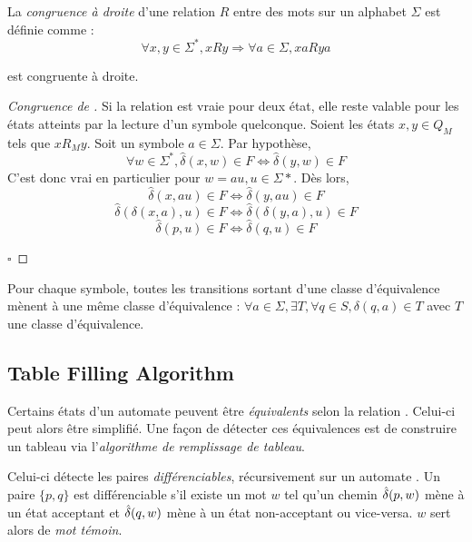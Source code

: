 La \emph{congruence à droite} d'une relation $R$ entre des mots sur un alphabet $\Sigma$ est définie comme :
$$
\forall x,y \in \Sigma^*, xRy \Rightarrow \forall a \in \Sigma, xaRya
$$

\begin{proposition}[Congruence de \rm]
 \rm est congruente à droite.
\end{proposition}

\begin{proof}[Congruence de \rm]
 Si la relation est vraie pour deux état, elle reste valable pour les états atteints par la lecture d'un symbole quelconque. Soient les états $x,y \in Q_M$ tels que $xR_My$. Soit un symbole $a \in \Sigma$. Par hypothèse,
 $$\forall w \in \Sigma^*, \hat{\delta}(x, w) \in F \iff \hat{\delta}(y, w) \in F$$
 C'est donc vrai en particulier pour $w = au, u \in \Sigma*$. Dès lors,
 $$\hat{\delta}(x, au) \in F\iff \hat{\delta}(y, au)\in F$$
 $$\hat{\delta}(\delta(x,a),u) \in F\iff\hat{\delta}(\delta(y,a),u)\in F$$
 $$\hat{\delta}(p,u) \in F\iff \hat{\delta}(q,u)\in F$$

\hfill$\square$
\end{proof}

\begin{corollary}\label{col:st}
 Pour chaque symbole, toutes les transitions sortant d'une classe d'équivalence mènent à une même classe d'équivalence :
 $\forall a \in \Sigma, \exists T, \forall q \in S, \delta(q,a)\in T$ avec $T$ une classe d'équivalence.
\end{corollary}



\subsection{Table Filling Algorithm}
Certains états d'un automate peuvent être \emph{équivalents} selon la relation \rm. Celui-ci peut alors être simplifié. Une façon de détecter ces équivalences est de construire un tableau via l'\emph{algorithme de remplissage de tableau}.

Celui-ci détecte les paires \emph{différenciables}, récursivement sur un automate \automaton. Un paire $\{p,q\}$ est différenciable s'il existe un mot $w$ tel qu'un chemin $\hat{\delta}(p,w)$ mène à un état acceptant et $\hat{\delta}(q,w)$ mène à un état non-acceptant ou vice-versa. $w$ sert alors de \emph{mot témoin}.

